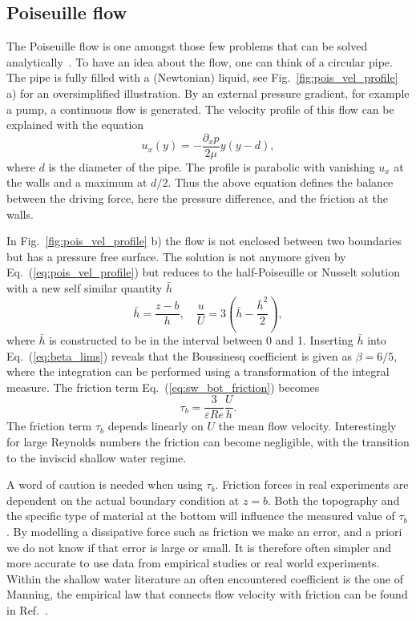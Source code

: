 \subsection{Poiseuille flow}
The Poiseuille flow is one amongst those few problems that can be solved analytically~\cite{suteraHistoryPoiseuilleLaw}.
To have an idea about the flow, one can think of a circular pipe.
The pipe is fully filled with a (Newtonian) liquid, see Fig.~\ref{fig:pois_vel_profile} a) for an oversimplified illustration.
By an external pressure gradient, for example a pump, a continuous flow is generated.
The velocity profile of this flow can be explained with the equation~\cite{batchelorIntroductionFluidDynamics1967, krugerLatticeBoltzmannMethod2017}
\begin{equation}\label{eq:pois_vel_profile}
    u_x(y) = -\frac{\partial_x p}{2\mu}y(y-d),
\end{equation}
where $d$ is the diameter of the pipe.
The profile is parabolic with vanishing $u_x$ at the walls and a maximum at $d/2$. 
Thus the above equation defines the balance between the driving force, here the pressure difference, and the friction at the walls.

In Fig.~\ref{fig:pois_vel_profile} b) the flow is not enclosed between two boundaries but has a pressure free surface.
The solution is not anymore given by Eq.~(\ref{eq:pois_vel_profile}) but reduces to the half-Poiseuille or Nusselt solution with a new self similar quantity $\bar{h}$~\cite{jamesNewFrictionModel2019}
\begin{equation}\label{eq:bar_h}
    \bar{h} = \frac{z - b}{h}, \quad \frac{u}{U} = 3\left(\bar{h} - \frac{\bar{h}^2}{2}\right), 
\end{equation}
where $\bar{h}$ is constructed to be in the interval between 0 and 1.
Inserting $\bar{h}$ into Eq.~(\ref{eq:beta_lims}) reveals that the Boussinesq coefficient is given as $\beta = 6/5$, where the integration can be performed using a transformation of the integral measure.
The friction term Eq.~(\ref{eq:sw_bot_friction}) becomes 
\begin{equation}
    \tau_b = \frac{3}{\varepsilon Re}\frac{U}{h} .
\end{equation}
The friction term $\tau_b$ depends linearly on $U$ the mean flow velocity.
Interestingly for large Reynolds numbers the friction can become negligible, with the transition to the inviscid shallow water regime.

A word of caution is needed when using $\tau_b$.
Friction forces in real experiments are dependent on the actual boundary condition at $z = b$.
Both the topography and the specific type of material at the bottom will influence the measured value of $\tau_b$. 
By modelling a dissipative force such as friction we make an error, and a priori we do not know if that error is large or small.
It is therefore often simpler and more accurate to use data from empirical studies or real world experiments.
Within the shallow water literature an often encountered coefficient is the one of Manning, the empirical law that connects flow velocity with friction can be found in Ref.~\cite{f.asceOpenChannelHydraulics2021}.

